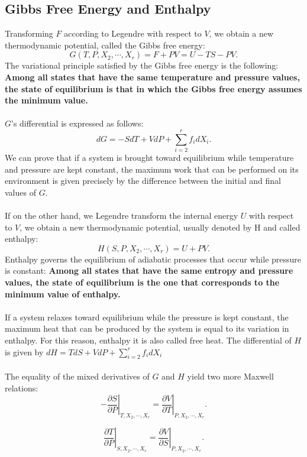 \subsection{Gibbs Free Energy and Enthalpy}
Transforming $F$ according to Legendre with respect to $V$, we obtain a new thermodynamic potential, called the Gibbs free energy:
\[G(T,P,X_2,\cdots,X_r) = F + PV = U - TS - PV.\]
The variational principle satisfied by the Gibbs free
energy is the following:
\textbf{Among all states that have the same temperature and pressure values, the state of equilibrium is that in which the Gibbs free energy assumes the minimum value.}
\\ \\
$G$'s differential is expressed as follows:
\[dG = -SdT + VdP + \sum_{i=2}^r f_i dX_i .\]
We can prove that if a system is brought toward equilibrium while temperature and pressure are kept constant, the maximum work that can be performed on its environment is given precisely by the difference between the initial and final values of $G$.
\\ \\
If on the other hand, we Legendre transform the internal energy $U$ with respect to $V$, we obtain a new thermodynamic potential, usually denoted by H and called enthalpy:
\[H(S,P,X_2,\cdots,X_r) = U + PV.\]
Enthalpy governs the equilibrium of adiabatic processes that occur while pressure is constant:
\textbf{Among all states that have the same entropy and pressure values, the state of equilibrium is the one that corresponds to the minimum value of enthalpy.}
\\ \\
If a system relaxes toward equilibrium while the pressure is kept constant, the maximum heat that can be produced by the system is equal to its variation in enthalpy. For this reason, enthalpy it is also called free heat.
The differential of $H$ is given by
$dH = TdS + VdP + \sum_{i=2}^r f_i dX_i$
\\ \\
The equality of the mixed derivatives of $G$ and $H$ yield two more Maxwell relations:
\[\left. -\frac{\partial S}{\partial P} \right|_{T,X_2,\cdots,X_r} = \left. \frac{\partial V}{\partial T} \right|_{P,X_2,\cdots,X_r}.\]

\[\left. \frac{\partial T}{\partial P} \right|_{S,X_2,\cdots,X_r} = \left. \frac{\partial V}{\partial S} \right|_{P,X_2,\cdots,X_r}.\]

